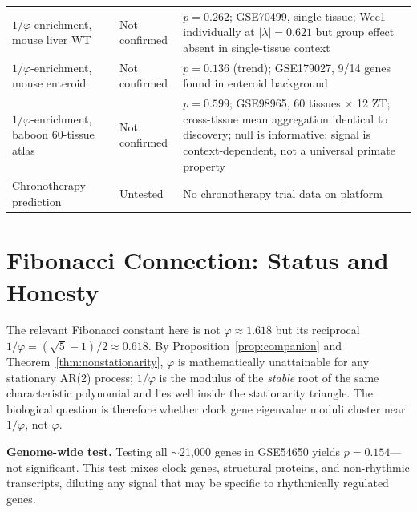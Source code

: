 \documentclass[11pt,letterpaper]{article}
\theoremstyle{definition}
\theoremstyle{remark}
\begin{document}
\begin{table}[H]
\begin{tabular}{p{5.5cm}p{2.2cm}p{5.5cm}}
$1/\varphi$-enrichment, mouse liver WT & Not confirmed & $p = 0.262$; GSE70499, single tissue; Wee1 individually at $|\lambda|=0.621$ but group effect absent in single-tissue context \\
$1/\varphi$-enrichment, mouse enteroid & Not confirmed & $p = 0.136$ (trend); GSE179027, 9/14 genes found in enteroid background \\
$1/\varphi$-enrichment, baboon 60-tissue atlas & Not confirmed & $p = 0.599$; GSE98965, 60 tissues $\times$ 12 ZT; cross-tissue mean aggregation identical to discovery; null is informative: signal is context-dependent, not a universal primate property \\
Chronotherapy prediction & Untested & No chronotherapy trial data on platform \\
\bottomrule
\end{tabular}
\end{table}

\section{Fibonacci Connection: Status and Honesty}

The relevant Fibonacci constant here is not $\varphi \approx 1.618$ but its reciprocal $1/\varphi = (\sqrt{5}-1)/2 \approx 0.618$. By Proposition~\ref{prop:companion} and Theorem~\ref{thm:nonstationarity}, $\varphi$ is mathematically unattainable for any stationary AR(2) process; $1/\varphi$ is the modulus of the \emph{stable} root of the same characteristic polynomial and lies well inside the stationarity triangle. The biological question is therefore whether clock gene eigenvalue moduli cluster near $1/\varphi$, not $\varphi$.

\textbf{Genome-wide test.} Testing all $\sim$21{,}000 genes in GSE54650 yields $p = 0.154$---not significant. This test mixes clock genes, structural proteins, and non-rhythmic transcripts, diluting any signal that may be specific to rhythmically regulated genes.
\end{document}
